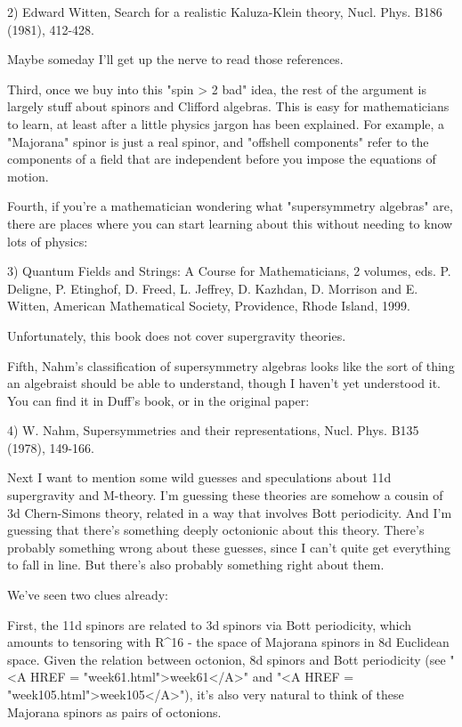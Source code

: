 2) Edward Witten, Search for a realistic Kaluza-Klein theory, Nucl. 
Phys. B186 (1981), 412-428. 
 
Maybe someday I'll get up the nerve to read those references. 
 
Third, once we buy into this "spin > 2 bad" idea, the rest
of the argument is largely stuff about spinors and Clifford algebras.
This is easy for mathematicians to learn, at least after a little
physics jargon has been explained.  For example, a "Majorana"
spinor is just a real spinor, and "offshell components" refer
to the components of a field that are independent before you impose the
equations of motion.
 
Fourth, if you're a mathematician wondering what "supersymmetry  
algebras" are, there are places where you can start learning about 
this without needing to know lots of physics: 
 
3) Quantum Fields and Strings: A Course for Mathematicians, 2 volumes,
eds. P. Deligne, P. Etinghof, D. Freed, L. Jeffrey, D. Kazhdan, D. Morrison 
and E. Witten, American Mathematical Society, Providence, Rhode Island,
1999.
 
Unfortunately, this book does not cover supergravity theories. 
 
Fifth, Nahm's classification of supersymmetry algebras looks like the 
sort of thing an algebraist should be able to understand, though I 
haven't yet understood it.  You can find it in Duff's book, or in the 
original paper:  
 
4) W. Nahm, Supersymmetries and their representations, Nucl. Phys. 
B135 (1978), 149-166. 
 
Next I want to mention some wild guesses and speculations about 11d  
supergravity and M-theory.  I'm guessing these theories are somehow 
a cousin of 3d Chern-Simons theory, related in a way that involves 
Bott periodicity.  And I'm guessing that there's something deeply 
octonionic about this theory.  There's probably something wrong about
these guesses, since I can't quite get everything to fall in line.
But there's also probably something right about them.
 
We've seen two clues already: 
 
First, the 11d spinors are related to 3d spinors via Bott periodicity,
which amounts to tensoring with R^{16} - the space of Majorana spinors
in 8d Euclidean space.  Given the relation between octonion, 8d spinors
and Bott periodicity (see "<A HREF = "week61.html">week61</A>"
and "<A HREF = "week105.html">week105</A>"), it's also very
natural to think of these Majorana spinors as pairs of octonions.
 
